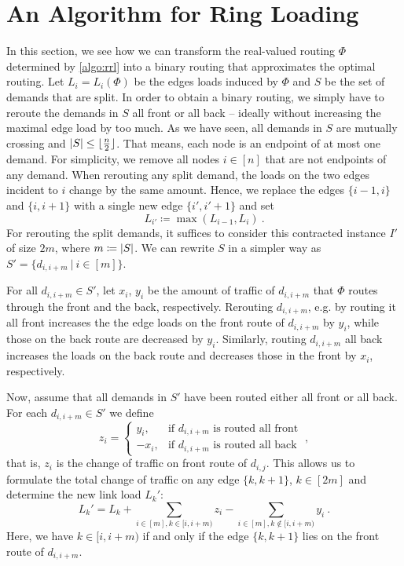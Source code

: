 \section{An Algorithm for Ring Loading}
\label{sec:ring-loading}

In this section, we see how we can transform the real-valued routing $\Phi$ determined by \cref{algo:rrl} into a binary routing that approximates the optimal routing.
Let $L_i = L_i(\Phi)$ be the edges loads induced by $\Phi$ and $S$ be the set of demands that are split.
In order to obtain a binary routing, we simply have to reroute the demands in $S$ all front or all back -- ideally without increasing the maximal edge load by too much. 
As we have seen, all demands in $S$ are mutually crossing and $\abs{S} \leq \lfloor \frac{n}{2} \rfloor$.
That means, each node is an endpoint of at most one demand.
For simplicity, we remove all nodes $i \in [n]$ that are not endpoints of any demand.
When rerouting any split demand, the loads on the two edges incident to $i$ change by the same amount.
Hence, we replace the edges $\{i-1, i\}$ and $\{i, i+1\}$ with a single new edge $\{i', i'+1\}$ and set 
\begin{equation}
	L_{i'} \coloneqq \max(L_{i-1}, L_i) \ .
\end{equation}
For rerouting the split demands, it suffices to consider this contracted instance $I'$ of size $2m$, where $m \coloneqq \abs{S}$.
We can rewrite $S$ in a simpler way as $S' = \{d_{i, i+m}\ |\ i \in [m]\}$.

For all $d_{i, i+m} \in S'$, let $x_i$, $y_i$ be the amount of traffic of $d_{i, i+m}$ that $\Phi$ routes through the front and the back, respectively.
Rerouting $d_{i, i+m}$, e.g. by routing it all front increases the the edge loads on the front route of $d_{i, i+m}$ by $y_i$, while those on the back route are decreased by $y_i$.
Similarly, routing $d_{i, i+m}$ all back increases the loads on the back route and decreases those in the front by $x_i$, respectively.

Now, assume that all demands in $S'$ have been routed either all front or all back.
For each $d_{i, i+m} \in S'$ we define
\begin{equation}
	z_i = \begin{cases}
		y_i, &\text{if } d_{i, i+m} \text{ is routed all front} \\
		-x_i, &\text{if } d_{i, i+m} \text{ is routed all back}
	\end{cases} \ ,
\end{equation}
that is, $z_i$ is the change of traffic on front route of $d_{i, j}$.
This allows us to formulate the total change of traffic on any edge $\{k, k+1\}$, $k \in [2m]$ and determine the new link load $L_k'$:
\begin{equation}
	\label{eq:load-change}
	L_k' = L_k + \sum_{i \in [m], k \in [i, i+m)} z_i - \sum_{i \in [m], k \notin [i, i+m)} y_i \ .
\end{equation}
Here, we have $k \in [i, i+m)$ if and only if the edge $\{k,k+1\}$ lies on the front route of $d_{i, i+m}$.


